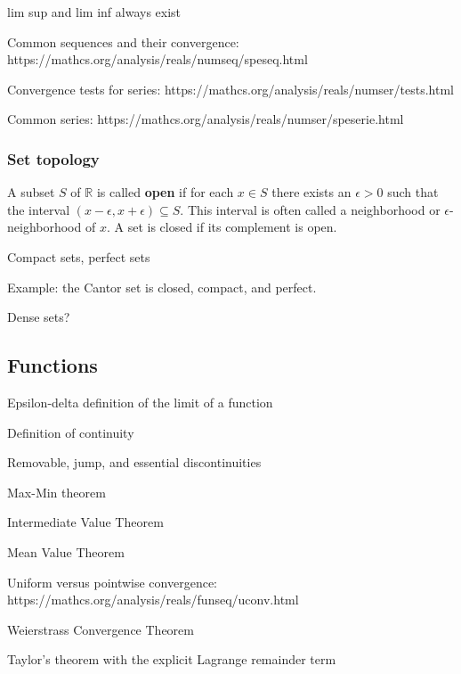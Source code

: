 \documentclass{article}
\begin{document}
lim sup and lim inf always exist

Common sequences and their convergence: https://mathcs.org/analysis/reals/numseq/speseq.html

Convergence tests for series: https://mathcs.org/analysis/reals/numser/tests.html

Common series: https://mathcs.org/analysis/reals/numser/speserie.html

\subsubsection*{Set topology}

A subset $S$ of $\mathbb{R}$ is called \textbf{open} if for each $x \in S$ there exists an $\epsilon > 0$ such that the interval $(x-\epsilon, x+\epsilon) \subseteq S$. This interval is often called a neighborhood or $\epsilon$-neighborhood of $x$. A set is closed if its complement is open.

Compact sets, perfect sets

Example: the Cantor set is closed, compact, and perfect. 

Dense sets?

\subsection*{Functions}

Epsilon-delta definition of the limit of a function

Definition of continuity

Removable, jump, and essential discontinuities

Max-Min theorem

Intermediate Value Theorem

Mean Value Theorem

Uniform versus pointwise convergence: https://mathcs.org/analysis/reals/funseq/uconv.html

Weierstrass Convergence Theorem

Taylor's theorem with the explicit Lagrange remainder term
\end{document}

